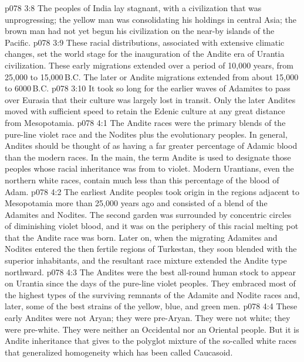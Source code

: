 \vs p078 3:8 The peoples of India lay stagnant, with a civilization that was unprogressing; the yellow man was consolidating his holdings in central Asia; the brown man had not yet begun his civilization on the near\hyp{}by islands of the Pacific.
\vs p078 3:9 \pc These racial distributions, associated with extensive climatic changes, set the world stage for the inauguration of the Andite era of Urantia civilization. These early migrations extended over a period of 10,000 years, from 25,000 to 15,000\,B.C. The later or Andite migrations extended from about 15,000 to 6000\,B.C.
\vs p078 3:10 It took so long for the earlier waves of Adamites to pass over Eurasia that their culture was largely lost in transit. Only the later Andites moved with sufficient speed to retain the Edenic culture at any great distance from Mesopotamia.
\vs p078 4:1 The Andite races were the primary blends of the pure\hyp{}line violet race and the Nodites plus the evolutionary peoples. In general, Andites should be thought of as having a far greater percentage of Adamic blood than the modern races. In the main, the term Andite is used to designate those peoples whose racial inheritance was from  to  violet. Modern Urantians, even the northern white races, contain much less than this percentage of the blood of Adam.
\vs p078 4:2 The earliest Andite peoples took origin in the regions adjacent to Mesopotamia more than 25,000 years ago and consisted of a blend of the Adamites and Nodites. The second garden was surrounded by concentric circles of diminishing violet blood, and it was on the periphery of this racial melting pot that the Andite race was born. Later on, when the migrating Adamites and Nodites entered the then fertile regions of Turkestan, they soon blended with the superior inhabitants, and the resultant race mixture extended the Andite type northward.
\vs p078 4:3 The Andites were the best all\hyp{}round human stock to appear on Urantia since the days of the pure\hyp{}line violet peoples. They embraced most of the highest types of the surviving remnants of the Adamite and Nodite races and, later, some of the best strains of the yellow, blue, and green men.
\vs p078 4:4 \pc These early Andites were not Aryan; they were pre\hyp{}Aryan. They were not white; they were pre\hyp{}white. They were neither an Occidental nor an Oriental people. But it is Andite inheritance that gives to the polyglot mixture of the so\hyp{}called white races that generalized homogeneity which has been called Caucasoid.
